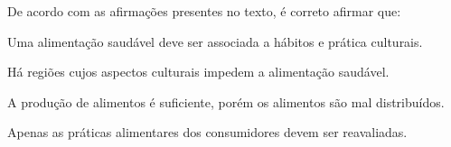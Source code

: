 
De acordo com as afirmações presentes no texto, é correto afirmar que:

\begin{escolha}

  \item Uma alimentação saudável deve ser associada a hábitos e prática culturais.
  
  \item Há regiões cujos aspectos culturais impedem a alimentação saudável.
  
  \item A produção de alimentos é suficiente, porém os alimentos são mal distribuídos.
  
  \item Apenas as práticas alimentares dos consumidores devem ser reavaliadas.

\end{escolha}

